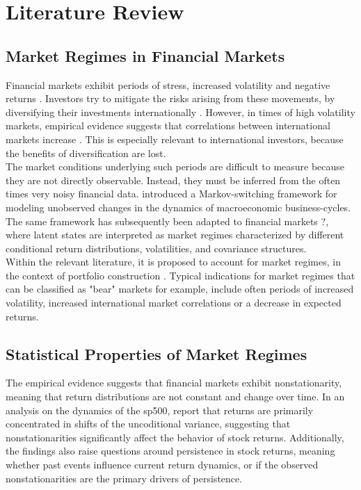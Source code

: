 \section{Literature Review}
\label{sec:literature_review}

\subsection{Market Regimes in Financial Markets}
Financial markets exhibit periods of stress, increased volatility and negative returns \cite{oertmann2026}. 
Investors try to mitigate the risks arising from these movements, 
by diversifying their investments internationally \cite{solnik1974}. However, in times of high volatility markets, empirical evidence suggests 
that correlations between international markets increase \cite{ang2002}. 
This is especially relevant to international investors, because the benefits of diversification are lost. \\

The market conditions underlying such periods are difficult to measure because they are not directly observable. Instead, they must be inferred from the often times very noisy financial data.
\cite{hamilton1989b} introduced a Markov-switching framework for modeling unobserved changes in the 
dynamics of macroeconomic business-cycles. The same framework has subsequently been adapted to financial markets {?}, where latent states are 
interpreted as market regimes characterized by different conditional return distributions, volatilities, and covariance structures.\\

Within the relevant literature, it is proposed to account for market regimes, 
in the context of portfolio construction \cite{ang2002}. Typical indications for market regimes that can be classified as "bear" markets for example, 
include often periods of increased volatility, increased international market correlations or a 
decrease in expected returns.

\subsection{Statistical Properties of Market Regimes}
The empirical evidence suggests that financial markets exhibit nonstationarity, meaning that return distributions are not constant and change over time.
In an analysis on the dynamics of the \gls{sp500}, \cite{starica2005} report that returns are primarily concentrated in shifts of the uncoditional variance,
suggesting that nonstationarities significantly affect the behavior of stock returns. Additionally, the findings also raise questions around persistence in stock returns, meaning whether past events influence current return dynamics, 
or if the observed nonstationarities are the primary drivers of persistence.  


